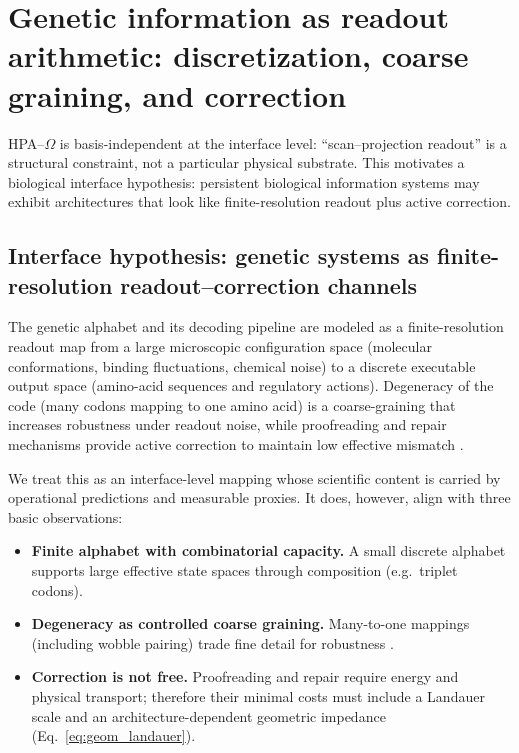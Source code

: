 \section{Genetic information as readout arithmetic: discretization, coarse graining, and correction}
\label{sec:genetic_readout}

HPA--$\Omega$ is basis-independent at the interface level: ``scan--projection readout'' is a structural constraint, not a particular physical substrate.
This motivates a biological interface hypothesis: persistent biological information systems may exhibit architectures that look like finite-resolution readout plus active correction.

\subsection{Interface hypothesis: genetic systems as finite-resolution readout--correction channels}
\label{sec:genetic_hypothesis}

\begin{remark}
\label{rem:genetic_interface}
The genetic alphabet and its decoding pipeline are modeled as a finite-resolution readout map from a large microscopic configuration space (molecular conformations, binding fluctuations, chemical noise) to a discrete executable output space (amino-acid sequences and regulatory actions).
Degeneracy of the code (many codons mapping to one amino acid) is a coarse-graining that increases robustness under readout noise, while proofreading and repair mechanisms provide active correction to maintain low effective mismatch \cite{Alberts2014,Crick1966,Hopfield1974,Ninio1975,Lindahl1993}.
\end{remark}

We treat this as an interface-level mapping whose scientific content is carried by operational predictions and measurable proxies.
It does, however, align with three basic observations:
\begin{itemize}
  \item \textbf{Finite alphabet with combinatorial capacity.}
  A small discrete alphabet supports large effective state spaces through composition (e.g.\ triplet codons).
  \item \textbf{Degeneracy as controlled coarse graining.}
  Many-to-one mappings (including wobble pairing) trade fine detail for robustness \cite{Crick1966}.
  \item \textbf{Correction is not free.}
  Proofreading and repair require energy and physical transport; therefore their minimal costs must include a Landauer scale and an architecture-dependent geometric impedance (Eq.~\eqref{eq:geom_landauer}).
\end{itemize}

